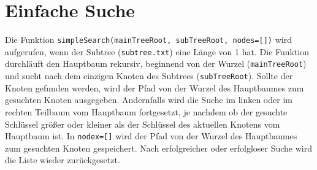 \documentclass{article}
\begin{document}
\section*{Einfache Suche}
Die Funktion \texttt{simpleSearch(mainTreeRoot, subTreeRoot, nodes=[])} wird aufgerufen, wenn der Subtree (\texttt{subtree.txt}) eine Länge von 1 hat. Die Funktion durchläuft den Hauptbaum rekursiv, beginnend von der Wurzel
(\texttt{mainTreeRoot}) und sucht nach dem einzigen Knoten des Subtrees (\texttt{subTreeRoot}). Sollte der Knoten gefunden werden, wird der Pfad von der Wurzel des Hauptbaumes zum gesuchten Knoten ausgegeben. Andernfalls wird die Suche im linken oder
im rechten Teilbaum vom Hauptbaum fortgesetzt, je nachdem ob der gesuchte Schlüssel größer oder kleiner als der Schlüssel des aktuellen Knotens vom Hauptbaum ist.
In \texttt{nodex=[]} wird der Pfad von der Wurzel des Hauptbaumes zum gesuchten Knoten gespeichert. Nach erfolgreicher oder erfolgloser Suche wird die Liste wieder zurückgesetzt.
\end{document}
